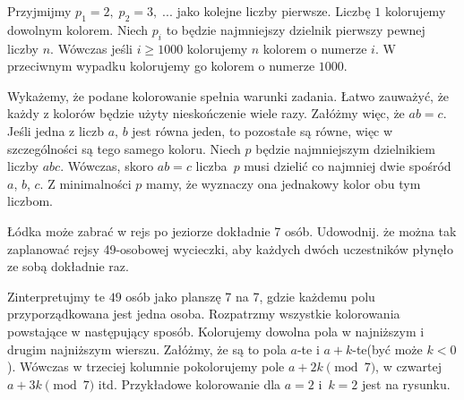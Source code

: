 \vspace{5px}

\noindent
Przyjmijmy $p_1 = 2,\; p_2 = 3, \; ...$ jako kolejne liczby pierwsze. Liczbę $1$ kolorujemy dowolnym kolorem. Niech $p_i$ to będzie najmniejszy dzielnik pierwszy pewnej liczby $n$. Wówczas jeśli $i \geqslant 1000$ kolorujemy $n$ kolorem o numerze $i$. W przeciwnym wypadku kolorujemy go kolorem o numerze $1000$.

\vspace{5px}

\noindent
Wykażemy, że podane kolorowanie spełnia warunki zadania. Łatwo zauważyć, że każdy z kolorów będzie użyty nieskończenie wiele razy. Załóżmy więc, że $ab = c$. Jeśli jedna z liczb $a$, $b$ jest równa jeden, to pozostałe są równe, więc w szczególności są tego samego koloru. Niech $p$ będzie najmniejszym dzielnikiem liczby $abc$. Wówczas, skoro $ab = c$ liczba~$p$ musi dzielić co najmniej dwie spośród $a$, $b$, $c$. Z minimalności $p$ mamy, że wyznaczy ona jednakowy kolor obu tym liczbom.

\vspace{10px}

\begin{problem}{5}
	Łódka może zabrać w rejs po jeziorze dokładnie 7 osób. Udowodnij. że można tak zaplanować rejsy 49-osobowej wycieczki, aby każdych dwóch uczestników płynęło ze sobą dokładnie raz.
\end{problem}

\noindent
Zinterpretujmy te $49$ osób jako planszę 7 na 7, gdzie każdemu polu przyporządkowana jest jedna osoba. Rozpatrzmy wszystkie kolorowania powstające w następujący sposób. Kolorujemy dowolna pola w najniższym i drugim najniższym wierszu. Załóżmy, że są to pola $a$-te i $a + k$-te(być może $k < 0$). Wówczas w trzeciej kolumnie pokolorujemy pole $a + 2k \pmod{7}$, w czwartej $a + 3k \pmod{7}$ itd. Przykładowe kolorowanie dla $a = 2$ i~$k = 2$ jest na rysunku.


\begin{center}
\end{center}

